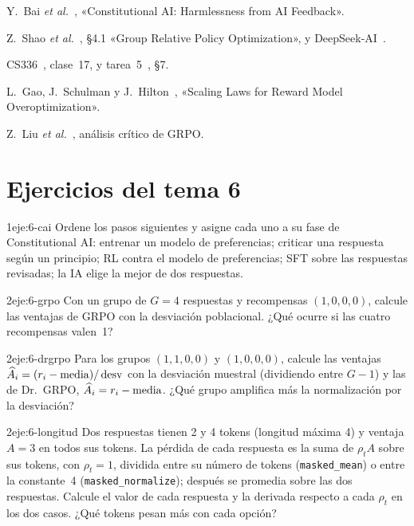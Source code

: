 \begin{lecturas}
\item Y.~Bai \emph{et al.}~\cite{cai}, «Constitutional AI: Harmlessness from AI Feedback».
\item Z.~Shao \emph{et al.}~\cite{deepseekmath}, §4.1 «Group Relative Policy Optimization», y DeepSeek-AI~\cite{r1}.
\item CS336~\cite{cs336}, clase~17, y tarea~5~\cite{cs336a5}, §7.
\item L.~Gao, J.~Schulman y J.~Hilton~\cite{gao}, «Scaling Laws for Reward Model Overoptimization».
\item Z.~Liu \emph{et al.}~\cite{drgrpo}, análisis crítico de GRPO.
\end{lecturas}

\section*{Ejercicios del tema 6}

\begin{ejercicio}{1}{eje:6-cai}
Ordene los pasos siguientes y asigne cada uno a su fase de Constitutional AI: entrenar un modelo de preferencias; criticar una respuesta según un principio; RL contra el modelo de preferencias; SFT sobre las respuestas revisadas; la IA elige la mejor de dos respuestas.
\end{ejercicio}

\begin{ejercicio}{2}{eje:6-grpo}
Con un grupo de $G=4$ respuestas y recompensas $(1,0,0,0)$, calcule las ventajas de GRPO con la desviación poblacional. ¿Qué ocurre si las cuatro recompensas valen~1?
\end{ejercicio}

\begin{ejercicio}{2}{eje:6-drgrpo}
Para los grupos $(1,1,0,0)$ y $(1,0,0,0)$, calcule las ventajas $\widehat A_i=(r_i-\operatorname{media})/\operatorname{desv}$ con la desviación muestral (dividiendo entre $G-1$) y las de Dr.~GRPO, $\widehat A_i=r_i-\operatorname{media}$. ¿Qué grupo amplifica más la normalización por la desviación?
\end{ejercicio}

\begin{ejercicio}{2}{eje:6-longitud}
Dos respuestas tienen 2 y 4 tokens (longitud máxima 4) y ventaja $A=3$ en todos sus tokens. La pérdida de cada respuesta es la suma de $\rho_tA$ sobre sus tokens, con $\rho_t=1$, dividida entre su número de tokens (\texttt{masked\_\allowbreak{}mean}) o entre la constante~4 (\texttt{masked\_\allowbreak{}normalize}); después se promedia sobre las dos respuestas. Calcule el valor de cada respuesta y la derivada respecto a cada $\rho_t$ en los dos casos. ¿Qué tokens pesan más con cada opción?
\end{ejercicio}

